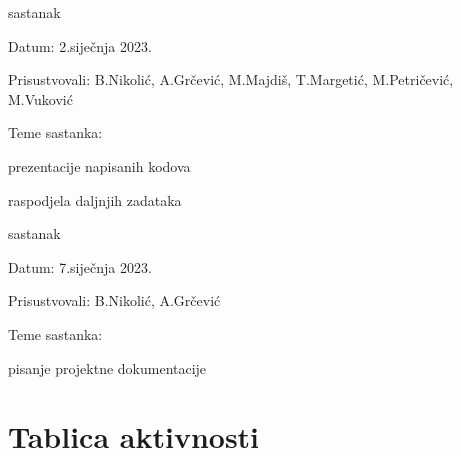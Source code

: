 \begin{packed_enum}
			
			\item sastanak
			
			\item[] \begin{packed_item}
				\item Datum: 2.siječnja 2023.
				\item Prisustvovali: B.Nikolić, A.Grčević, M.Majdiš, T.Margetić, M.Petričević, M.Vuković
				\item Teme sastanka:
				\begin{packed_item}
					\item prezentacije napisanih kodova
					\item raspodjela daljnjih zadataka
				\end{packed_item}
			\end{packed_item}
		
			\item sastanak
			
			\item[] \begin{packed_item}
				\item Datum: 7.siječnja 2023.
				\item Prisustvovali: B.Nikolić, A.Grčević
				\item Teme sastanka:
				\begin{packed_item}
					\item pisanje projektne dokumentacije
				\end{packed_item}
			\end{packed_item}
		
		\end{packed_enum}
	
		\eject
		
		\section*{Tablica aktivnosti}
		
